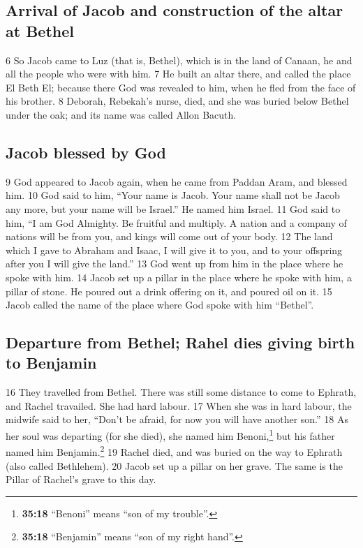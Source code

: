 \hypertarget{arrival-of-jacob-and-construction-of-the-altar-at-bethel}{%
\subsection{Arrival of Jacob and construction of the altar at
Bethel}\label{arrival-of-jacob-and-construction-of-the-altar-at-bethel}}

{6} So Jacob came to Luz (that is, Bethel), which is in the land of
Canaan, he and all the people who were with him. {7} He built an altar
there, and called the place El Beth El; because there God was revealed
to him, when he fled from the face of his brother. {8} Deborah,
Rebekah's nurse, died, and she was buried below Bethel under the oak;
and its name was called Allon Bacuth.

\hypertarget{jacob-blessed-by-god}{%
\subsection{Jacob blessed by God}\label{jacob-blessed-by-god}}

{9} God appeared to Jacob again, when he came from Paddan Aram, and
blessed him. {10} God said to him, ``Your name is Jacob. Your name shall
not be Jacob any more, but your name will be Israel.'' He named him
Israel. {11} God said to him, ``I am God Almighty. Be fruitful and
multiply. A nation and a company of nations will be from you, and kings
will come out of your body. {12} The land which I gave to Abraham and
Isaac, I will give it to you, and to your offspring after you I will
give the land.'' {13} God went up from him in the place where he spoke
with him. {14} Jacob set up a pillar in the place where he spoke with
him, a pillar of stone. He poured out a drink offering on it, and poured
oil on it. {15} Jacob called the name of the place where God spoke with
him ``Bethel''.

\hypertarget{departure-from-bethel-rahel-dies-giving-birth-to-benjamin}{%
\subsection{Departure from Bethel; Rahel dies giving birth to
Benjamin}\label{departure-from-bethel-rahel-dies-giving-birth-to-benjamin}}

{16} They travelled from Bethel. There was still some distance to come
to Ephrath, and Rachel travailed. She had hard labour. {17} When she was
in hard labour, the midwife said to her, ``Don't be afraid, for now you
will have another son.'' {18} As her soul was departing (for she died),
she named him Benoni,\footnote{\textbf{35:18} ``Benoni'' means ``son of
  my trouble''.} but his father named him Benjamin.\footnote{\textbf{35:18}
  ``Benjamin'' means ``son of my right hand''.} {19} Rachel died, and
was buried on the way to Ephrath (also called Bethlehem). {20} Jacob set
up a pillar on her grave. The same is the Pillar of Rachel's grave to
this day.

